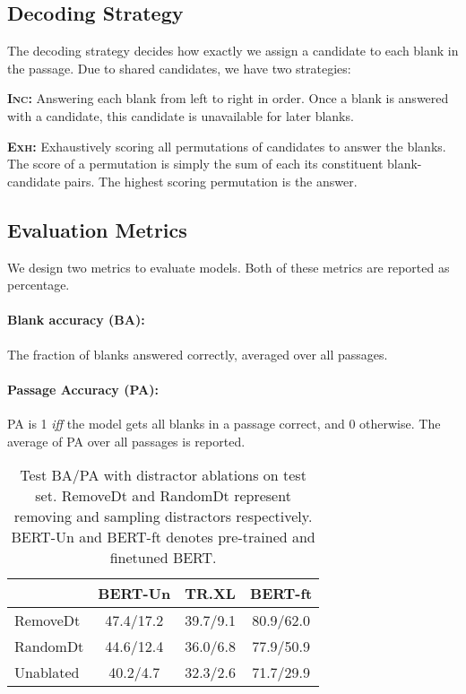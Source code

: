 \documentclass[11pt,a4paper]{article}
\newenvironment{tight_enumerate}{
\begin{enumerate}
  \setlength{\itemsep}{0pt}
  \setlength{\parskip}{0pt}
}{\end{enumerate}}
\begin{document}
\subsection{Decoding Strategy}
The decoding strategy decides how exactly we assign a candidate to each blank in the passage. Due to shared candidates, we have two strategies:
\begin{tight_enumerate}
  \setlength{\parskip}{0pt}
  \setlength{\itemsep}{0pt plus 1pt}
    \item \textsc{\textbf{Inc:}}  Answering each blank from left to right in order. Once a blank is answered with a candidate, this candidate is unavailable for later blanks. 
    \item \textsc{\textbf{Exh:}} Exhaustively scoring all permutations of candidates to answer the blanks. The score of a permutation is simply the sum of each its constituent blank-candidate pairs. The highest scoring permutation is the answer.
\end{tight_enumerate}


\subsection{Evaluation Metrics}
We design two metrics to evaluate models. Both of these metrics are reported as percentage.
\paragraph{Blank accuracy (BA):} The fraction of blanks answered correctly, averaged over all passages.
\paragraph{Passage Accuracy (PA):} PA is 1 \emph{iff} the model gets all blanks in a passage correct, and 0 otherwise. The average of PA over all passages is reported.


\begin{table}
    \centering
    \begin{tabular}{l|c|c|c}
    \toprule
         & BERT-Un & TR.XL & BERT-ft\\
         \midrule
        RemoveDt & 47.4/17.2 & 39.7/9.1  & 80.9/62.0\\
        RandomDt & 44.6/12.4 & 36.0/6.8  & 77.9/50.9\\
        Unablated & 40.2/4.7 & 32.3/2.6 & 71.7/29.9\\
        \bottomrule
    \end{tabular}
    \caption{Test BA/PA with distractor ablations on test set. RemoveDt and RandomDt represent removing and sampling distractors respectively. BERT-Un and BERT-ft denotes pre-trained and finetuned BERT.}
    \label{tab:ablationres}
\end{table}
\end{document}
